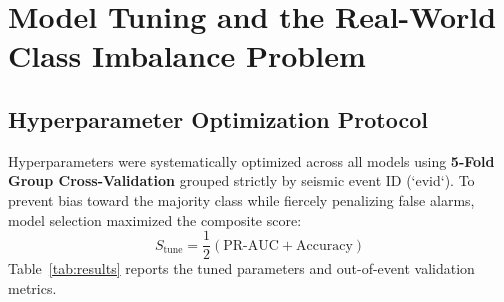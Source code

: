 \documentclass[11pt,a4paper]{article}
\begin{document}
\section{Model Tuning and the Real-World Class Imbalance Problem}

\subsection{Hyperparameter Optimization Protocol}
Hyperparameters were systematically optimized across all models using \textbf{5-Fold Group Cross-Validation} grouped strictly by seismic event ID (`evid`). To prevent bias toward the majority class while fiercely penalizing false alarms, model selection maximized the composite score:
\begin{equation*}
    S_{\text{tune}} = \frac{1}{2} \left( \text{PR-AUC} + \text{Accuracy} \right)
\end{equation*}
Table~\ref{tab:results} reports the tuned parameters and out-of-event validation metrics.
\end{document}
